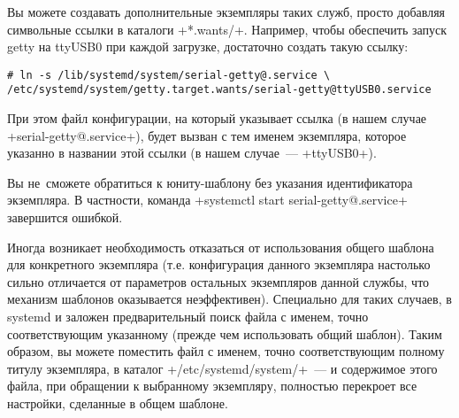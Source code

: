 \documentclass[10pt,oneside,a4paper]{article}
\begin{document}
Вы можете создавать дополнительные экземпляры таких служб, просто добавляя
символьные ссылки в каталоги +*.wants/+. Например, чтобы обеспечить запуск getty
на ttyUSB0 при каждой загрузке, достаточно создать такую ссылку:
\begin{Verbatim}
# ln -s /lib/systemd/system/serial-getty@.service \
/etc/systemd/system/getty.target.wants/serial-getty@ttyUSB0.service
\end{Verbatim}
При этом файл конфигурации, на который указывает ссылка (в нашем случае
+serial-getty@.service+), будет вызван с тем именем экземпляра, которое указанно
в названии этой ссылки (в нашем случае~--- +ttyUSB0+).

Вы не~сможете обратиться к юниту-шаблону без указания идентификатора экземпляра.
В частности, команда +systemctl start serial-getty@.service+ завершится ошибкой.

Иногда возникает необходимость отказаться от использования общего шаблона
для конкретного экземпляра (т.е. конфигурация данного экземпляра настолько
сильно отличается от параметров остальных экземпляров данной службы, что
механизм шаблонов оказывается неэффективен). Специально для таких случаев, в
systemd и заложен предварительный поиск файла с именем, точно соответствующим
указанному (прежде чем использовать общий шаблон). Таким образом, вы можете
поместить файл с именем, точно соответствующим полному титулу экземпляра, в
каталог +/etc/systemd/system/+~--- и содержимое этого файла, при обращении
к выбранному экземпляру, полностью перекроет все настройки, сделанные в общем
шаблоне.
\end{document}
